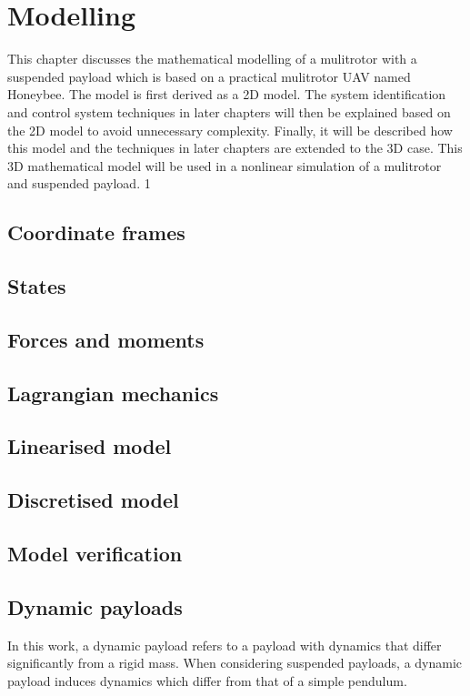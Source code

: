 \graphicspath{{modelling/fig/}}

\chapter{Modelling}
\label{chap:modelling}

This chapter discusses the mathematical modelling of a mulitrotor with a suspended
payload which is based on a practical mulitrotor UAV named Honeybee.
The model is first derived as a \gls{2D} model.
The system identification and control system techniques in later chapters will then be explained based on the \gls{2D} model to avoid unnecessary complexity.
Finally, it will be described how this model and the techniques in later chapters are extended to the 3D case.
This 3D mathematical model will be used in a nonlinear simulation of a mulitrotor and suspended payload.
1
\section{Coordinate frames}
\section{States}
\section{Forces and moments}
\section{Lagrangian mechanics}
\section{Linearised model}
    \label{sec:linear_model}

\section{Discretised model}
\section{Model verification}
\section{Dynamic payloads}

    In this work, a dynamic payload refers to a payload with dynamics that differ significantly from a rigid mass.
    When considering suspended payloads, a dynamic payload induces dynamics which differ from that of a simple pendulum.

